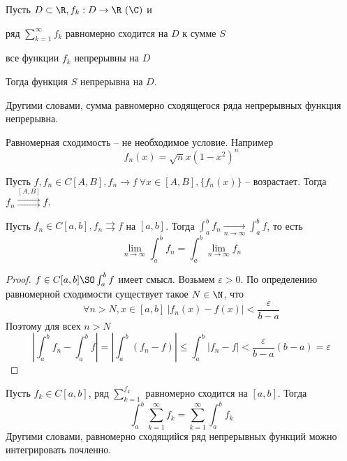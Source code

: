 \begin{Cons}
	Пусть $D \subset \R, f_k : D \to \R \ (\C)$ и
	\begin{MyList}
		\item ряд $\sum_{k=1}^{\infty} f_k$ равномерно сходится на $D$ к сумме $S$
		\item все функции $f_k$ непрерывны на $D$ 
	\end{MyList} 
	Тогда функция $S$ непрерывна на $D$. 

	Другими словами, сумма равномерно сходящегося ряда непрерывных функция непрерывна.
\end{Cons}

\begin{Prop}
	Равномерная сходимость -- не необходимое условие. Например
	\[f_n(x) = \sqrt{n} x(1 - x^2)^n\]
\end{Prop}

\begin{Thm}
	Пусть $f, f_n \in C[A, B], f_n \to f \ \forall x \in [A, B], \{f_n(x)\}$ -- возрастает. Тогда $f_n \overset{[A, B]}{\rightrightarrows}f$. 
\end{Thm}

\begin{Thm}
	Пусть $f_n \in C[a, b], f_n \rightrightarrows f$ на $[a, b]$. Тогда $\int_{a}^{b} f_n \xrightarrow[n \to \infty]{} \int_{a}^{b} f$, то есть
	\[\lim_{n \to \infty} \int_{a}^{b} f_n = \int_{a}^{b} \lim_{n \to \infty} f_n\] 
\end{Thm}

\begin{proof}
	$f \in C[a, b] \SO \int_{a}^{b} f$ имеет смысл. Возьмем $\varepsilon > 0$. 
	По определению равномерной сходимости существует такое $N \in \N$, что
	\[\forall n > N, x \in [a, b] \ |f_n(x) - f(x)| < \frac{\varepsilon}{b - a}\]
	Поэтому для всех $n > N$
	\[\left|\int_{a}^{b} f_n - \int_{a}^{b} f\right| = \left|\int_{a}^{b} (f_n - f)\right| \leqslant \int_{a}^{b} |f_n - f| < \frac{\varepsilon}{b - a}(b - a) = \varepsilon\]
\end{proof}

\begin{Thm}
	Пусть $f_k \in C[a, b]$, ряд $\sum_{k=1}^{f_k}$ равномерно сходится на $[a, b]$. Тогда
	\[\int_{a}^{b} \sum_{k=1}^{\infty} f_k = \sum_{k=1}^{\infty} \int_{a}^{b} f_k\] 
	Другими словами, равномерно сходящийся ряд непрерывных функций можно интегрировать почленно.
\end{Thm}

